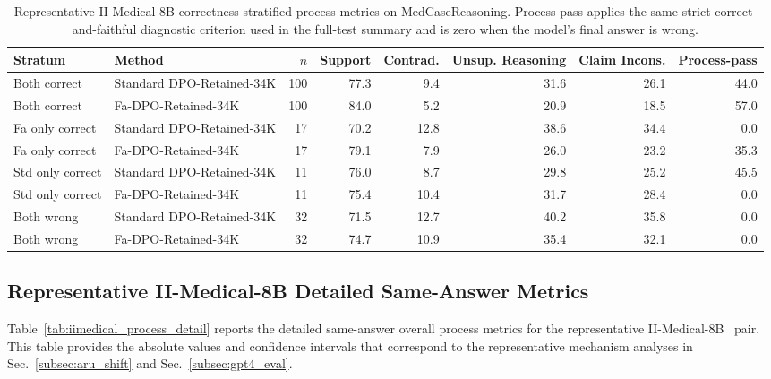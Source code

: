\documentclass[a4paper,fleqn,doubleblind]{cas-sc}
\begin{document}
\begin{table}[p]
    \centering
    \scriptsize
    \setlength{\tabcolsep}{4pt}
    \caption{Representative II-Medical-8B correctness-stratified process metrics on MedCaseReasoning. Process-pass applies the same strict correct-and-faithful diagnostic criterion used in the full-test summary and is zero when the model's final answer is wrong.}
    \label{tab:iimedical_correctness_stratified_process}
    \begin{adjustbox}{max width=\textwidth}
    \begingroup\color{blue}
    \begin{tabular}{llrrrrrr}
        \toprule
        \textbf{Stratum} & \textbf{Method} & \textbf{$n$} & \textbf{Support} & \textbf{Contrad.} & \textbf{Unsup. Reasoning} & \textbf{Claim Incons.} & \textbf{Process-pass} \\
        \midrule
        Both correct & Standard DPO-Retained-34K & 100 & 77.3 & 9.4 & 31.6 & 26.1 & 44.0 \\
        Both correct & Fa-DPO-Retained-34K & 100 & 84.0 & 5.2 & 20.9 & 18.5 & 57.0 \\
        Fa only correct & Standard DPO-Retained-34K & 17 & 70.2 & 12.8 & 38.6 & 34.4 & 0.0 \\
        Fa only correct & Fa-DPO-Retained-34K & 17 & 79.1 & 7.9 & 26.0 & 23.2 & 35.3 \\
        Std only correct & Standard DPO-Retained-34K & 11 & 76.0 & 8.7 & 29.8 & 25.2 & 45.5 \\
        Std only correct & Fa-DPO-Retained-34K & 11 & 75.4 & 10.4 & 31.7 & 28.4 & 0.0 \\
        Both wrong & Standard DPO-Retained-34K & 32 & 71.5 & 12.7 & 40.2 & 35.8 & 0.0 \\
        Both wrong & Fa-DPO-Retained-34K & 32 & 74.7 & 10.9 & 35.4 & 32.1 & 0.0 \\
        \bottomrule
    \end{tabular}
    \endgroup
    \end{adjustbox}
\end{table}

\subsection{Representative II-Medical-8B Detailed Same-Answer Metrics}

Table~\ref{tab:iimedical_process_detail} reports the detailed same-answer overall process metrics for the representative II-Medical-8B~\cite{intelligentinternet2025iimedical8b} pair. This table provides the absolute values and confidence intervals that correspond to the representative mechanism analyses in Sec.~\ref{subsec:aru_shift} and Sec.~\ref{subsec:gpt4_eval}.
\end{document}
